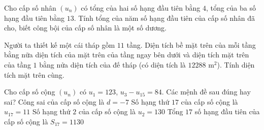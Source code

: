 \begin{ex}%
	Cho cấp số nhân $({{u}_{n}} )$ có tổng của hai số hạng đầu tiên bằng $4$, tổng của ba số hạng đầu tiên bằng $13$. Tính tổng của năm số hạng đầu tiên của cấp số nhân đã cho, biết công bội của cấp số nhân là một số dương.\par
\end{ex}

\begin{ex}%
	Người ta thiết kế một cái tháp gồm $11$ tầng. Diện tích bề mặt trên của mỗi tầng bằng nữa diện tích của mặt trên của tầng ngay bên dưới và diện tích mặt trên của tầng $1$ bằng nửa diện tích của đế tháp (có diện tích là $12288$ m$^2$). Tính diện tích mặt trên cùng.\par
\end{ex}

\begin{ex}%
	Cho cấp số cộng $(u_n)$ có $u_1=123$, $u_3-u_{15}=84$. Các mệnh đề sau đúng hay sai?
	\choiceTF
	{\True Công sai của cấp số cộng là $d=-7$}
	{\True Số hạng thứ $17$ của cấp số cộng là $u_{17}=11$}
	{Số hạng thứ $2$ của cấp số cộng là $u_2=130$}
	{Tổng $17$ số hạng đầu tiên của cấp số cộng là $S_{17}=1130$}
\end{ex}

